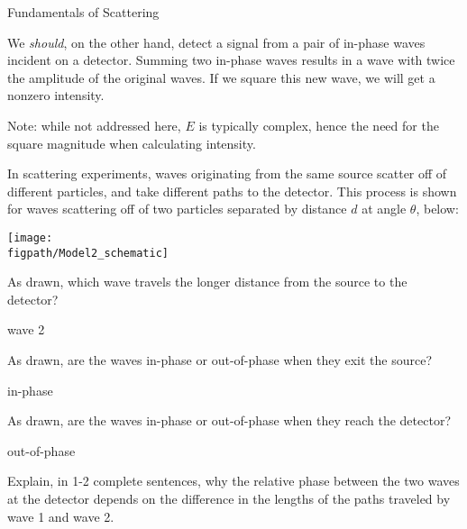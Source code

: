 \begin{activity}{Fundamentals of Scattering}
\begin{ctqs}
\begin{solution}[2in]{}
			We \emph{should}, on the other hand, detect a signal from a pair of in-phase waves incident on a detector.  Summing two in-phase waves results in a wave with twice the amplitude of the original waves.  If we square this new wave, we will get a nonzero intensity.
			
			Note: while not addressed here, $E$ is typically complex, hence the need for the square magnitude when calculating intensity.
		\end{solution}

\end{ctqs}

\clearpage
\begin{model}
\label{\labelbase:mdl:twoparticlescattering}
	
	In scattering experiments, waves originating from the same source scatter off of different particles, and take different paths to the detector.  This process is shown for waves scattering off of two particles separated by distance $d$ at angle $\theta$, below:
	
	\vspace{6pt}
	\centerline{\texttt{[image: \\figpath/Model2\_schematic]}}
	
\end{model}

\begin{ctqs}

	\question As drawn, which wave travels the longer distance from the source to the detector?
	
		\begin{solution}[0.25in]{}
			wave 2
		\end{solution}
	
	\question As drawn, are the waves in-phase or out-of-phase when they exit the source?
	
		\begin{solution}[0.25in]{}
			in-phase
		\end{solution}
	
	\question As drawn, are the waves in-phase or out-of-phase when they reach the detector?
	
		\begin{solution}[0.25in]{}
			out-of-phase
		\end{solution}
	
	\question Explain, in 1-2 complete sentences, why the relative phase between the two waves at the detector depends on the difference in the lengths of the paths traveled by wave 1 and wave 2.
	

\end{ctqs}
\end{activity}
